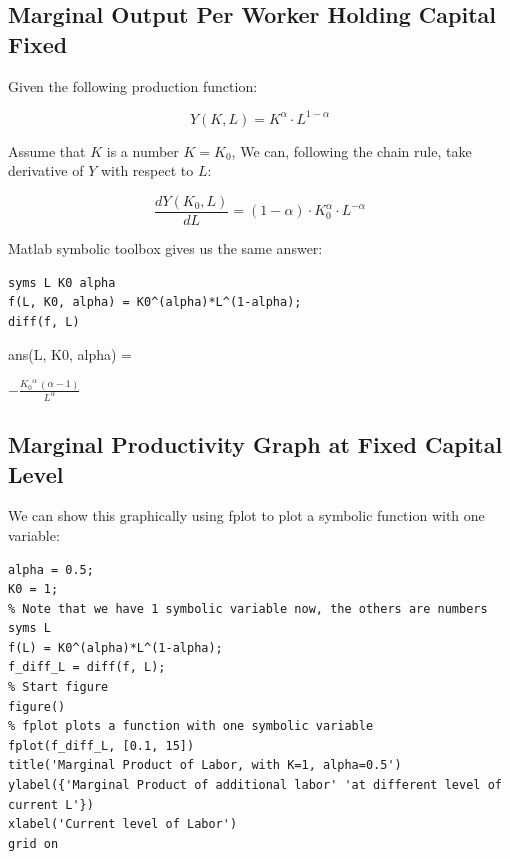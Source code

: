 \documentclass[
]{book}
\begin{document}
\hypertarget{marginal-output-per-worker-holding-capital-fixed}{%
\subsection{Marginal Output Per Worker Holding Capital Fixed}\label{marginal-output-per-worker-holding-capital-fixed}}

Given the following production function:

\[Y(K,L)=K^{\alpha } \cdot L^{1-\alpha }\]

Assume that \(K\) is a number \(K=K_0\), We can, following the chain rule,
take derivative of \(Y\) with respect to \(L\):

\[\frac{dY(K_0 ,L)}{dL}=(1-\alpha )\cdot K_0^{\alpha } \cdot L^{-\alpha }\]

Matlab symbolic toolbox gives us the same answer:

\begin{verbatim}
syms L K0 alpha
f(L, K0, alpha) = K0^(alpha)*L^(1-alpha);
diff(f, L)
\end{verbatim}

ans(L, K0, alpha) =

\(\displaystyle -\frac{{K_0 }^{\alpha } \,{\left(\alpha -1\right)}}{L^{\alpha } }\)

\hypertarget{marginal-productivity-graph-at-fixed-capital-level}{%
\subsection{Marginal Productivity Graph at Fixed Capital Level}\label{marginal-productivity-graph-at-fixed-capital-level}}

We can show this graphically using fplot to plot a symbolic function
with one variable:

\begin{verbatim}
alpha = 0.5;
K0 = 1;
% Note that we have 1 symbolic variable now, the others are numbers
syms L
f(L) = K0^(alpha)*L^(1-alpha);
f_diff_L = diff(f, L);
% Start figure
figure()
% fplot plots a function with one symbolic variable
fplot(f_diff_L, [0.1, 15])
title('Marginal Product of Labor, with K=1, alpha=0.5')
ylabel({'Marginal Product of additional labor' 'at different level of current L'})
xlabel('Current level of Labor')
grid on
\end{verbatim}
\end{document}
